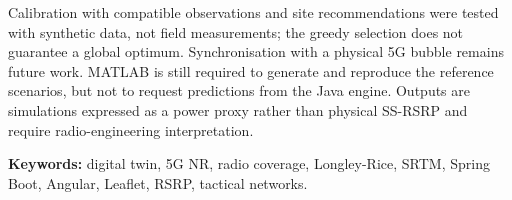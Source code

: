 Calibration with compatible observations and site recommendations were tested with
synthetic data, not field measurements; the greedy selection does not guarantee a
global optimum. Synchronisation with a physical 5G bubble remains future work.
MATLAB is still required to generate and reproduce the reference
scenarios, but not to request predictions from the Java engine. Outputs are simulations
expressed as a power proxy rather than physical SS-RSRP and require radio-engineering interpretation.

\vspace{1em}
\textbf{Keywords:} digital twin, 5G NR, radio coverage, Longley-Rice, SRTM, Spring Boot,
Angular, Leaflet, RSRP, tactical networks.
